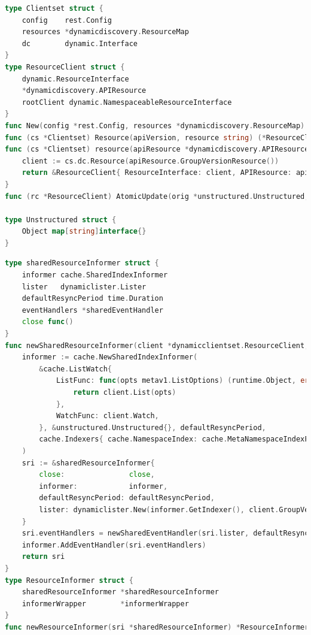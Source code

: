 \documentclass[macfonts,master]{njuthesis}
\begin{document}
\begin{lstlisting}[language=Go,caption=客户端实现,label=listing:client]
type Clientset struct {
	config    rest.Config
	resources *dynamicdiscovery.ResourceMap
	dc        dynamic.Interface
}
type ResourceClient struct {
	dynamic.ResourceInterface
	*dynamicdiscovery.APIResource
	rootClient dynamic.NamespaceableResourceInterface
}
func New(config *rest.Config, resources *dynamicdiscovery.ResourceMap) (*Clientset, error)
func (cs *Clientset) Resource(apiVersion, resource string) (*ResourceClient, error)
func (cs *Clientset) resource(apiResource *dynamicdiscovery.APIResource) *ResourceClient {
	client := cs.dc.Resource(apiResource.GroupVersionResource())
	return &ResourceClient{ ResourceInterface: client, APIResource: apiResource, rootClient: client, }
}
func (rc *ResourceClient) AtomicUpdate(orig *unstructured.Unstructured, update func(obj *unstructured.Unstructured) bool) (result *unstructured.Unstructured, err error)

type Unstructured struct {
	Object map[string]interface{}
}
\end{lstlisting}

\begin{lstlisting}[language=Go,caption=通知器（Informer）实现,label=listing:informer]
type sharedResourceInformer struct {
	informer cache.SharedIndexInformer
	lister   dynamiclister.Lister
	defaultResyncPeriod time.Duration
	eventHandlers *sharedEventHandler
	close func()
}
func newSharedResourceInformer(client *dynamicclientset.ResourceClient, defaultResyncPeriod time.Duration, close func()) *sharedResourceInformer {
	informer := cache.NewSharedIndexInformer(
		&cache.ListWatch{
			ListFunc: func(opts metav1.ListOptions) (runtime.Object, error) {
				return client.List(opts)
			},
			WatchFunc: client.Watch,
		}, &unstructured.Unstructured{}, defaultResyncPeriod,
		cache.Indexers{ cache.NamespaceIndex: cache.MetaNamespaceIndexFunc, },
	)
	sri := &sharedResourceInformer{
		close:               close,
		informer:            informer,
		defaultResyncPeriod: defaultResyncPeriod,
		lister: dynamiclister.New(informer.GetIndexer(), client.GroupVersionResource()),
	}
	sri.eventHandlers = newSharedEventHandler(sri.lister, defaultResyncPeriod)
	informer.AddEventHandler(sri.eventHandlers)
	return sri
}
type ResourceInformer struct {
	sharedResourceInformer *sharedResourceInformer
	informerWrapper        *informerWrapper
}
func newResourceInformer(sri *sharedResourceInformer) *ResourceInformer
\end{lstlisting}
\end{document}
